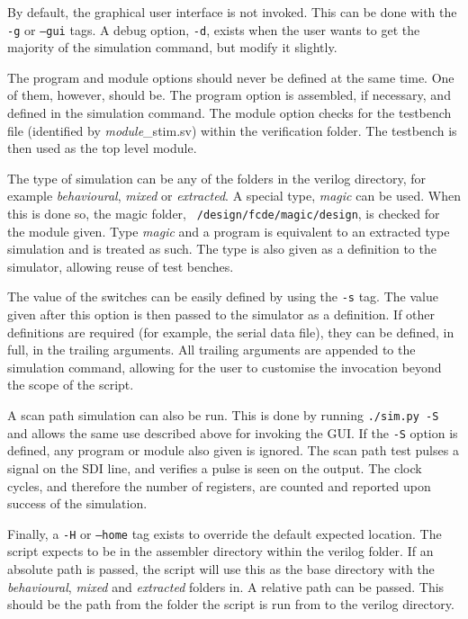 By default, the graphical user interface is not invoked. 
This can be done with the \texttt{-g} or \texttt{--gui} tags. 
A debug option, \texttt{-d}, exists when the user wants to get the majority of the simulation command, but modify it slightly. 

The program and module options should never be defined at the same time. 
One of them, however, should be. 
The program option is assembled, if necessary, and defined in the simulation command. 
The module option checks for the testbench file (identified by \textit{module}\_stim.sv) within the verification folder. 
The testbench is then used as the top level module. 

The type of simulation can be any of the folders in the verilog directory, for example \textit{behavioural}, \textit{mixed} or \textit{extracted}. 
A special type, \textit{magic} can be used.
When this is done so, the magic folder, \texttt{~/design/fcde/magic/design}, is checked for the module given. 
Type \textit{magic} and a program is equivalent to an extracted type simulation and is treated as such. 
The type is also given as a definition to the simulator, allowing reuse of test benches. 

The value of the switches can be easily defined by using the \texttt{-s} tag. 
The value given after this option is then passed to the simulator as a definition. 
If other definitions are required (for example, the serial data file), they can be defined, in full, in the trailing arguments. 
All trailing arguments are appended to the simulation command, allowing for the user to customise the invocation beyond the scope of the script. 

A scan path simulation can also be run.
This is done by running \texttt{./sim.py -S} and allows the same use described above for invoking the GUI.
If the \texttt{-S} option is defined, any program or module also given is ignored.
The scan path test pulses a signal on the SDI line, and verifies a pulse is seen on the output. 
The clock cycles, and therefore the number of registers, are counted and reported upon success of the simulation.

Finally, a \texttt{-H} or \texttt{--home} tag exists to override the default expected location. 
The script expects to be in the assembler directory within the verilog folder. 
If an absolute path is passed, the script will use this as the base directory with the \textit{behavioural}, \textit{mixed} and \textit{extracted} folders in.
A relative path can be passed. 
This should be the path from the folder the script is run from to the verilog directory. 

